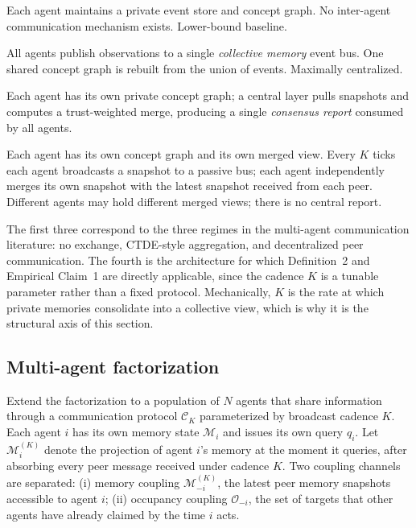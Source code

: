 \documentclass{article}
\begin{document}
\begin{description}[leftmargin=10pt,topsep=2pt,itemsep=2pt]
\item[Independent.] Each agent maintains a private event store and concept graph. No inter-agent communication mechanism exists. Lower-bound baseline.
\item[Shared bus.] All agents publish observations to a single \emph{collective memory} event bus. One shared concept graph is rebuilt from the union of events. Maximally centralized.
\item[Central aggregator (ConsensusLayer).] Each agent has its own private concept graph; a central layer pulls snapshots and computes a trust-weighted merge, producing a single \emph{consensus report} consumed by all agents.
\item[Peer-to-peer broadcast (cadence $K$).] Each agent has its own concept graph and its own merged view. Every $K$ ticks each agent broadcasts a snapshot to a passive bus; each agent independently merges its own snapshot with the latest snapshot received from each peer. Different agents may hold different merged views; there is no central report.
\end{description}

The first three correspond to the three regimes in the multi-agent
communication literature: no exchange, CTDE-style aggregation, and
decentralized peer communication. The fourth is the architecture for
which Definition~2 and Empirical Claim~1 are directly
applicable, since the cadence $K$ is a tunable parameter rather than a
fixed protocol. Mechanically, $K$ is the rate at which private
memories consolidate into a collective view, which is why it is the
structural axis of this section.

\subsection{Multi-agent factorization}
\label{sec:multi-theory}

Extend the factorization to a population of $N$ agents that share
information through a communication protocol $\mathcal{C}_K$
parameterized by broadcast cadence $K$. Each agent $i$ has its own
memory state $\mathcal{M}_i$ and issues its own query $q_i$. Let
$\mathcal{M}_i^{(K)}$ denote the projection of agent $i$'s memory at
the moment it queries, after absorbing every peer message received
under cadence $K$. Two coupling channels are separated: (i) memory
coupling $\mathcal{M}_{-i}^{(K)}$, the latest peer memory snapshots
accessible to agent $i$; (ii) occupancy coupling $\mathcal{O}_{-i}$,
the set of targets that other agents have already claimed by the time
$i$ acts.
\end{document}
